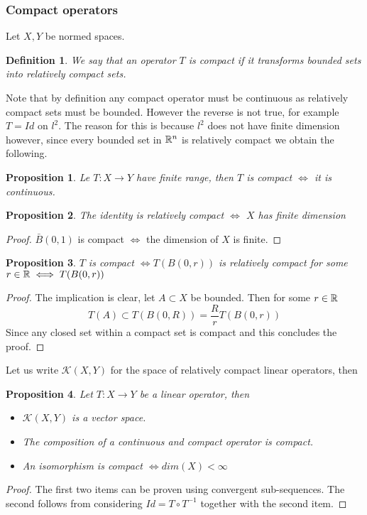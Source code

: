 \documentclass[12pt]{article}
\newtheorem{proposition}{Proposition}
\newtheorem{definition}{Definition}
\begin{document}
\subsubsection{Compact operators}
Let $X,Y$ be normed spaces.
\begin{definition}
    We say that an operator $T$ is compact if it transforms bounded sets into relatively compact sets.
\end{definition}
Note that by definition any compact operator must be continuous as relatively compact sets must be bounded. However the reverse is not true, for example $T=Id$ on $l^2$. The reason for this is because $l^2$ does not have finite dimension however, since every bounded set in ${\mathbb R}^n$ is relatively compact we obtain the following.
\begin{proposition}
    Le $T:X\to Y$ have finite range, then $T$ is compact $\iff$ it is continuous.
\end{proposition}
\begin{proposition}
    The identity is relatively compact $\iff$ $X$ has finite dimension
\end{proposition}
\begin{proof}
    $\bar{B}(0,1)$ is compact $\iff$ the dimension of $X$ is finite.
\end{proof}
\begin{proposition}
    $T$ is compact $\iff T(B(0,r))$ is relatively compact for some $r\in{\mathbb R}\iff T(B(0,r))$
\end{proposition}
\begin{proof}
    The implication is clear, let $A\subset X$ be bounded. Then for some $r\in{\mathbb R}$
    \begin{equation*}
        T(A)\subset T(B(0,R))=\frac{R}{r} T(B(0,r))
    \end{equation*}
    Since any closed set within a compact set is compact and this concludes the proof.
\end{proof}
Let us write $\mathcal{K}(X,Y)$ for the space of relatively compact linear operators, then
\begin{proposition}
    Let $T:X\to Y$ be a linear operator, then
    \begin{itemize}
        \item $\mathcal{K}(X,Y)$ is a vector space.
        \item The composition of a continuous and compact operator is compact.
        \item An isomorphism is compact $\iff dim(X)<\infty$
    \end{itemize}
\end{proposition}
\begin{proof}
    The first two items can be proven using convergent sub-sequences. The second follows from considering $Id=T\circ T^{-1}$ together with the second item.
\end{proof}
\end{document}
